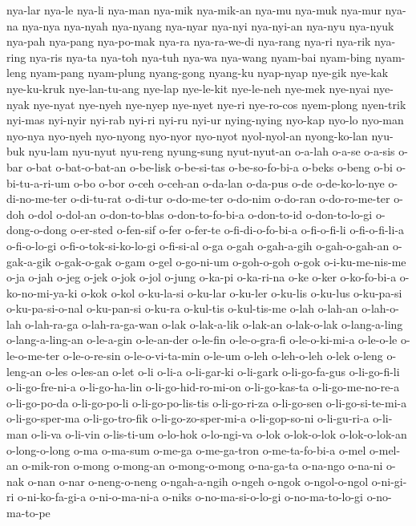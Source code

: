 {nya-lar nya-le nya-li nya-man nya-mik nya-mik-an nya-mu nya-muk nya-mur
nya-na nya-nya nya-nyah nya-nyang nya-nyar nya-nyi nya-nyi-an nya-nyu
nya-nyuk nya-pah nya-pang nya-po-mak nya-ra nya-ra-we-di nya-rang nya-ri
nya-rik nya-ring nya-ris nya-ta nya-toh nya-tuh nya-wa nya-wang nyam-bai
nyam-bing nyam-leng nyam-pang nyam-plung nyang-gong nyang-ku nyap-nyap
nye-gik nye-kak nye-ku-kruk nye-lan-tu-ang nye-lap nye-le-kit nye-le-neh
nye-mek nye-nyai nye-nyak nye-nyat nye-nyeh nye-nyep nye-nyet nye-ri
nye-ro-cos nyem-plong nyen-trik nyi-mas nyi-nyir nyi-rab nyi-ri nyi-ru
nyi-ur nying-nying nyo-kap nyo-lo nyo-man nyo-nya nyo-nyeh nyo-nyong
nyo-nyor nyo-nyot nyol-nyol-an nyong-ko-lan nyu-buk nyu-lam nyu-nyut
nyu-reng nyung-sung nyut-nyut-an o-a-lah o-a-se o-a-sis o-bar o-bat
o-bat-o-bat-an o-be-lisk o-be-si-tas o-be-so-fo-bi-a o-beks o-beng o-bi
o-bi-tu-a-ri-um o-bo o-bor o-ceh o-ceh-an o-da-lan o-da-pus o-de
o-de-ko-lo-nye o-di-no-me-ter o-di-tu-rat o-di-tur o-do-me-ter o-do-nim
o-do-ran o-do-ro-me-ter o-doh o-dol o-dol-an o-don-to-blas
o-don-to-fo-bi-a o-don-to-id o-don-to-lo-gi o-dong-o-dong o-er-sted
o-fen-sif o-fer o-fer-te o-fi-di-o-fo-bi-a o-fi-o-fi-li o-fi-o-fi-li-a
o-fi-o-lo-gi o-fi-o-tok-si-ko-lo-gi o-fi-si-al o-ga o-gah o-gah-a-gih
o-gah-o-gah-an o-gak-a-gik o-gak-o-gak o-gam o-gel o-go-ni-um o-goh-o-goh
o-gok o-i-ku-me-nis-me o-ja o-jah o-jeg o-jek o-jok o-jol o-jung o-ka-pi
o-ka-ri-na o-ke o-ker o-ko-fo-bi-a o-ko-no-mi-ya-ki o-kok o-kol o-ku-la-si
o-ku-lar o-ku-ler o-ku-lis o-ku-lus o-ku-pa-si o-ku-pa-si-o-nal
o-ku-pan-si o-ku-ra o-kul-tis o-kul-tis-me o-lah o-lah-an o-lah-o-lah
o-lah-ra-ga o-lah-ra-ga-wan o-lak o-lak-a-lik o-lak-an o-lak-o-lak
o-lang-a-ling o-lang-a-ling-an o-le-a-gin o-le-an-der o-le-fin
o-le-o-gra-fi o-le-o-ki-mi-a o-le-o-le o-le-o-me-ter o-le-o-re-sin
o-le-o-vi-ta-min o-le-um o-leh o-leh-o-leh o-lek o-leng o-leng-an o-les
o-les-an o-let o-li o-li-a o-li-gar-ki o-li-gark o-li-go-fa-gus
o-li-go-fi-li o-li-go-fre-ni-a o-li-go-ha-lin o-li-go-hid-ro-mi-on
o-li-go-kas-ta o-li-go-me-no-re-a o-li-go-po-da o-li-go-po-li
o-li-go-po-lis-tis o-li-go-ri-za o-li-go-sen o-li-go-si-te-mi-a
o-li-go-sper-ma o-li-go-tro-fik o-li-go-zo-sper-mi-a o-li-gop-so-ni
o-li-gu-ri-a o-li-man o-li-va o-li-vin o-lis-ti-um o-lo-hok o-lo-ngi-va
o-lok o-lok-o-lok o-lok-o-lok-an o-long-o-long o-ma o-ma-sum o-me-ga
o-me-ga-tron o-me-ta-fo-bi-a o-mel o-mel-an o-mik-ron o-mong o-mong-an
o-mong-o-mong o-na-ga-ta o-na-ngo o-na-ni o-nak o-nan o-nar o-neng-o-neng
o-ngah-a-ngih o-ngeh o-ngok o-ngol-o-ngol o-ni-gi-ri o-ni-ko-fa-gi-a
o-ni-o-ma-ni-a o-niks o-no-ma-si-o-lo-gi o-no-ma-to-lo-gi o-no-ma-to-pe
}
